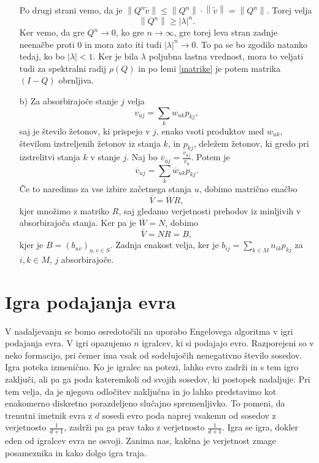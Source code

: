 \documentclass[twoside,11pt]{article}
\begin{document}
\begin{enumerate}
\[\]
Po drugi strani vemo, da je $\left\lVert Q^n\widetilde{v} \right\rVert\leq \left\lVert Q^n \right\rVert \cdot \left\lVert \widetilde{v} \right\rVert = \left\lVert Q^n \right\rVert$.
Torej velja
$$ \left\lVert Q^n \right\rVert \geq \left\lvert \lambda\right\rvert^n.$$
Ker vemo, da gre $Q^n \rightarrow 0$, ko gre $n \rightarrow \infty$, gre torej leva stran zadnje neenačbe proti 0 in mora zato iti tudi $\left\lvert \lambda \right\rvert^n \rightarrow 0$. To pa se bo zgodilo natanko tedaj, ko bo $\left\lvert \lambda \right\rvert < 1$. Ker je bila $\lambda$ poljubna lastna vrednost, mora to veljati tudi za spektralni radij $\rho(Q)$ in po lemi \ref{matrike} je potem matrika $(I-Q)$ obrnljiva.

\item[b)] Za absorbirajoče stanje $j$ velja
$$v_{uj} = \sum_{k} w_{uk}p_{kj},$$
saj je število žetonov, ki prispejo v $j$, enako vsoti produktov med $w_{uk}$, številom izstreljenih žetonov iz stanja $k$, in $p_{kj}$, deležem žetonov, ki gredo pri izstrelitvi stanja $k$ v stanje $j$. \newline
Naj bo $\overline{v}_{uj} = \frac{v_{uj}}{v_{u}}$. Potem je
$$ \overline{v}_{uj} = \sum_{k} \overline{w}_{uk}p_{kj}.$$
Če to naredimo za vse izbire začetnega stanja $u$, dobimo matrično enačbo
$$\overline{V} = \overline{W}R,$$
kjer množimo z matriko $R$, saj gledamo verjetnosti prehodov iz minljivih v absorbirajoča stanja.
Ker pa je $\overline{W} = N$, dobimo 
$$\overline{V} = NR = B, $$
kjer je $B = (b_{uv})_{u,v \in S}$. Zadnja enakost velja, ker je $b_{ij} = \sum_{k\in M} n_{ik}p_{kj}$ za $i,k \in M$, $j$ absorbirajoče.

\hfill \QED
\end{enumerate}


\section{Igra podajanja evra}
V nadaljevanju se bomo osredotočili na uporabo Engelovega algoritma v igri podajanja evra. V igri opazujemo $n$ 
igralcev, ki si podajajo evro. Razporejeni so v neko formacijo, pri čemer ima vsak od sodelujočih nenegativno število sosedov. Igra poteka izmenično. 
Ko je igralec na potezi, lahko evro zadrži in s tem igro zaključi, ali pa ga poda kateremkoli od svojih sosedov, ki postopek nadaljuje. Pri tem velja, da je njegova odločitev naključna in jo lahko predstavimo kot enakomerno diskretno porazdeljeno slučajno spremenljivko. To pomeni, da trenutni imetnik evra z $d$ sosedi evro poda naprej vsakemu od sosedov
z verjetnosto $\frac{1}{d+1}$, zadrži pa ga prav tako z verjetnosto $\frac{1}{d+1}$. Igra se igra, dokler eden od igralcev evra ne osvoji. Zanima nas, kakšna je verjetnost zmage posameznika in kako dolgo igra traja.
\end{document}
